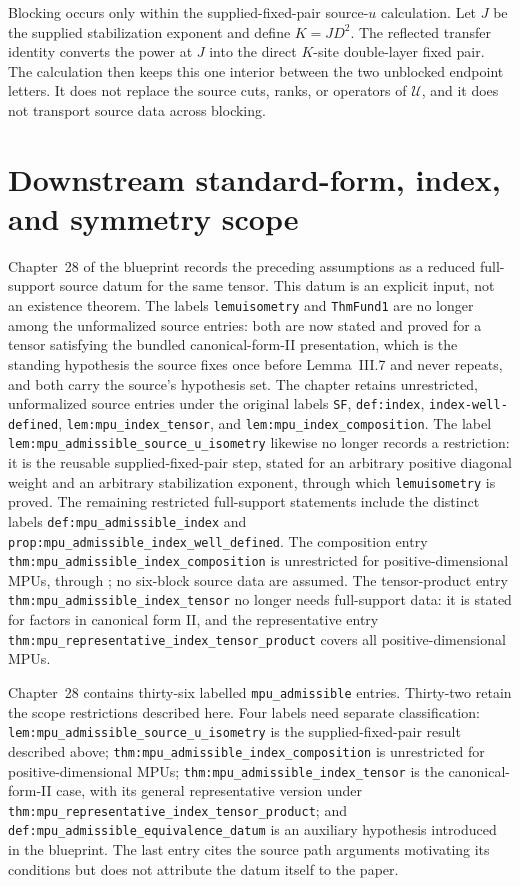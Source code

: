 \documentclass{article}
\begin{document}
Blocking occurs only within the supplied-fixed-pair source-$u$ calculation.
Let $J$ be the supplied stabilization exponent and define $K=JD^2$. The
reflected transfer identity converts the power at $J$ into the direct
$K$-site double-layer fixed pair. The calculation then keeps this one interior
between the two unblocked endpoint letters. It does not replace the source
cuts, ranks, or operators of $\mathcal U$, and it does not transport source
data across blocking.

\section{Downstream standard-form, index, and symmetry scope}

Chapter~28 of the blueprint records the preceding assumptions as a reduced
full-support source datum for the same tensor. This datum is an explicit input,
not an existence theorem. The labels \texttt{lemuisometry} and
\texttt{ThmFund1} are no longer among the unformalized source entries: both
are now stated and proved for a tensor satisfying the bundled
canonical-form-II presentation, which is the standing hypothesis the source
fixes once before Lemma~III.7 and never repeats, and both carry the source's
hypothesis set. The chapter retains unrestricted, unformalized source entries
under the original labels \texttt{SF}, \texttt{def:index},
\texttt{index-well-defined}, \texttt{lem:mpu\_index\_tensor}, and
\texttt{lem:mpu\_index\_composition}. The label
\texttt{lem:mpu\_admissible\_source\_u\_isometry} likewise no longer
records a restriction: it is the reusable supplied-fixed-pair step, stated for
an arbitrary positive diagonal weight and an arbitrary stabilization exponent,
through which \texttt{lemuisometry} is proved. The remaining restricted
full-support statements include the distinct labels
\texttt{def:mpu\_admissible\_index} and
\texttt{prop:mpu\_admissible\_index\_well\_defined}.
The composition entry \texttt{thm:mpu\_admissible\_index\_composition}
is unrestricted for positive-dimensional MPUs, through
; no six-block source data are assumed. The tensor-product entry
\texttt{thm:mpu\_admissible\_index\_tensor} no longer needs full-support
data: it is stated for factors in canonical form II, and the representative
entry \texttt{thm:mpu\_representative\_index\_tensor\_product} covers all
positive-dimensional MPUs.

Chapter~28 contains thirty-six labelled \texttt{mpu\_admissible} entries.
Thirty-two retain the scope restrictions described here. Four labels need
separate classification: \texttt{lem:mpu\_admissible\_source\_u\_isometry}
is the supplied-fixed-pair result described above;
\texttt{thm:mpu\_admissible\_index\_composition} is unrestricted for
positive-dimensional MPUs; \texttt{thm:mpu\_admissible\_index\_tensor}
is the canonical-form-II case, with its general representative version under
\texttt{thm:mpu\_representative\_index\_tensor\_product}; and
\texttt{def:mpu\_admissible\_equivalence\_datum} is an auxiliary hypothesis
introduced in the blueprint. The last entry cites the source path arguments
motivating its conditions but does not attribute the datum itself to the paper.
\end{document}

